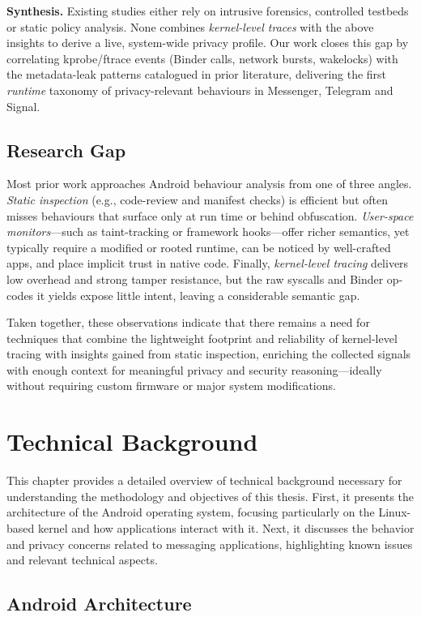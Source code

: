 \documentclass[a4paper,12pt]{report}
\begin{document}
\medskip
\noindent\textbf{Synthesis.}
Existing studies either rely on intrusive forensics, controlled testbeds
or static policy analysis.  None combines \emph{kernel-level traces} with
the above insights to derive a live, system-wide privacy profile.
Our work closes this gap by correlating kprobe/ftrace events
(Binder calls, network bursts, wakelocks) with the metadata-leak patterns
catalogued in prior literature, delivering the first \emph{runtime}
taxonomy of privacy-relevant behaviours in Messenger, Telegram and Signal.

\section{Research Gap}\label{sec:rw:gap}
Most prior work approaches Android behaviour analysis from one of three angles.
\emph{Static inspection} (e.g., code-review and manifest checks) is efficient but often misses behaviours that surface only at run time or behind obfuscation.
\emph{User-space monitors}—such as taint-tracking or framework hooks—offer richer semantics, yet typically require a modified or rooted runtime, can be noticed by well-crafted apps, and place implicit trust in native code.
Finally, \emph{kernel-level tracing} delivers low overhead and strong tamper resistance, but the raw syscalls and Binder op-codes it yields expose little intent, leaving a considerable semantic gap.

Taken together, these observations indicate that there remains a need for techniques that combine the lightweight footprint and reliability of kernel-level tracing with insights gained from static inspection, enriching the collected signals with enough context for meaningful privacy and security reasoning—ideally without requiring custom firmware or major system modifications.

\chapter{Technical Background}

This chapter provides a detailed overview of technical background necessary for understanding the methodology and objectives of this thesis. First, it presents the architecture of the Android operating system, focusing particularly on the Linux-based kernel and how applications interact with it. Next, it discusses the behavior and privacy concerns related to messaging applications, highlighting known issues and relevant technical aspects. \section{Android Architecture}
\end{document}
